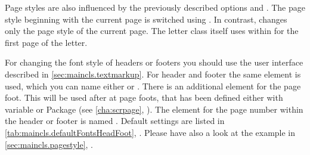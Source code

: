 Page styles are also influenced by the previously described
options
 and
. The page style beginning with
the current page is switched using . In contrast,
 changes only the page style of the current
page. The letter class itself uses
 within
 for the first page of the letter.

%
%
%
%
For changing the font style of headers or footers you should use the user
interface described in \autoref{sec:maincls.textmarkup}.  For header and
footer the same element is used, which you can name either
 or
.  There is an
additional element 
for the page foot. This will be used after  at page
foots, that has been defined either with variable
 or Package
 (see \autoref{cha:scrpage},
). The element for the page
number within the header or footer is named
. Default settings
are listed in \autoref{tab:maincls.defaultFontsHeadFoot},
.  Please have also a look at
the example in \autoref{sec:maincls.pagestyle},
.
%
%
%
%
%
%
%
%
%
%
%
%


